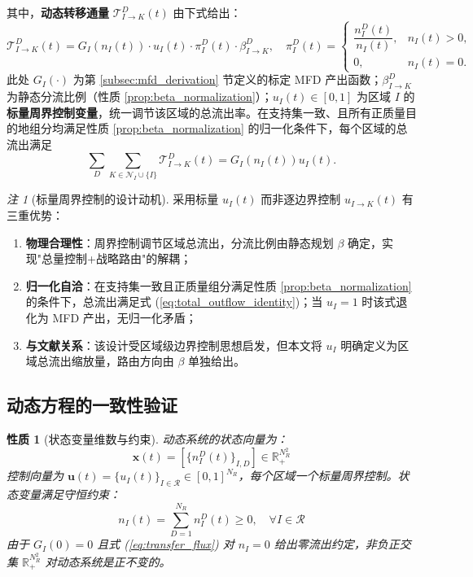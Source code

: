 \documentclass[a4paper,12pt]{article}
\theoremstyle{plain}
\newtheorem{property}[theorem]{性质}
\theoremstyle{definition}
\theoremstyle{remark}
\newtheorem{remark}[theorem]{注}
\begin{document}
其中，\textbf{动态转移通量} $\mathcal{T}_{I \to K}^D(t)$ 由下式给出：
\begin{equation}\label{eq:transfer_flux}
    \mathcal{T}_{I \to K}^D(t) = G_I(n_I(t)) \cdot u_I(t) \cdot \pi_I^D(t) \cdot \beta_{I \to K}^D,
    \quad
    \pi_I^D(t)=
    \begin{cases}
    \dfrac{n_I^D(t)}{n_I(t)}, & n_I(t)>0,\\[0.8em]
    0, & n_I(t)=0 .
    \end{cases}
\end{equation}
此处 $G_I(\cdot)$ 为第 \ref{subsec:mfd_derivation} 节定义的标定 MFD 产出函数；$\beta_{I \to K}^D$ 为静态分流比例（性质 \ref{prop:beta_normalization}）；$u_I(t) \in [0, 1]$ 为区域 $I$ 的\textbf{标量周界控制变量}，统一调节该区域的总流出率。在支持集一致、且所有正质量目的地组分均满足性质 \ref{prop:beta_normalization} 的归一化条件下，每个区域的总流出满足
\begin{equation}\label{eq:total_outflow_identity}
    \sum_D\sum_{K\in\mathcal N_I\cup\{I\}}\mathcal T_{I\to K}^D(t)=G_I(n_I(t))u_I(t).
\end{equation}

\begin{remark}[标量周界控制的设计动机]\label{rem:scalar_control}
采用标量 $u_I(t)$ 而非逐边界控制 $u_{I \to K}(t)$ 有三重优势：
\begin{enumerate}
    \item \textbf{物理合理性}：周界控制调节区域总流出，分流比例由静态规划 $\beta$ 确定，实现"总量控制+战略路由"的解耦；
    \item \textbf{归一化自洽}：在支持集一致且正质量组分满足性质 \ref{prop:beta_normalization} 的条件下，总流出满足式 (\ref{eq:total_outflow_identity})；当 $u_I = 1$ 时该式退化为 MFD 产出，无归一化矛盾；
    \item \textbf{与文献关系}：该设计受区域级边界控制思想启发，但本文将 $u_I$ 明确定义为区域总流出缩放量，路由方向由 $\beta$ 单独给出。
\end{enumerate}
\end{remark}

\subsection{动态方程的一致性验证}

\begin{property}[状态变量维数与约束]\label{prop:dynamic_consistency}
动态系统的状态向量为：
\begin{equation}
    \bm{x}(t) = \left[\{n_I^D(t)\}_{I,D}\right] \in \mathbb{R}_{+}^{N_R^2}
\end{equation}
控制向量为 $\bm{u}(t) = \{u_I(t)\}_{I \in \mathcal{R}} \in [0,1]^{N_R}$，每个区域一个标量周界控制。状态变量满足守恒约束：
\begin{equation}
    n_I(t) = \sum_{D=1}^{N_R} n_I^D(t) \ge 0, \quad \forall I \in \mathcal{R}
\end{equation}
由于 $G_I(0)=0$ 且式 (\ref{eq:transfer_flux}) 对 $n_I=0$ 给出零流出约定，非负正交集 $\mathbb R_+^{N_R^2}$ 对动态系统是正不变的。
\end{property}
\end{document}
